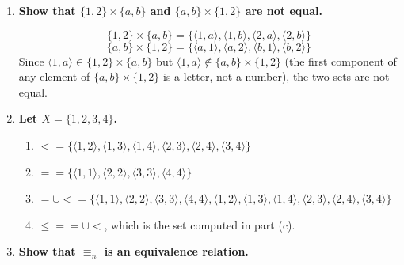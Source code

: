 \documentclass[11pt,openany]{book}
\begin{document}
\begin{enumerate}[{0.}1. ]
\begin{enumerate}
\begin{center}
\end{center}
\end{enumerate}

\item \textbf{Show that $\{1,2\}\times\{a,b\}$ and $\{a,b\}\times\{1,2\}$ are not equal.}

\[
\{1,2\}\times\{a,b\} = \{\langle 1,a\rangle,\langle 1,b\rangle,\langle 2,a\rangle,\langle 2,b\rangle\}
\]
\[
\{a,b\}\times\{1,2\} = \{\langle a,1\rangle,\langle a,2\rangle,\langle b,1\rangle,\langle b,2\rangle\}
\]
Since $\langle 1,a\rangle \in \{1,2\}\times\{a,b\}$ but $\langle 1,a\rangle \notin \{a,b\}\times\{1,2\}$ (the first component of any element of $\{a,b\}\times\{1,2\}$ is a letter, not a number), the two sets are not equal.

\item \textbf{Let $X=\{1,2,3,4\}$.}

\begin{enumerate}
\item $<  =\{\langle 1,2\rangle,\langle 1,3\rangle,\langle 1,4\rangle,\langle 2,3\rangle,\langle 2,4\rangle,\langle 3,4\rangle\}$

\item $=  = \{\langle 1,1\rangle,\langle 2,2\rangle,\langle 3,3\rangle,\langle 4,4\rangle\}$

\item $=\cup< = \{\langle 1,1\rangle,\langle 2,2\rangle,\langle 3,3\rangle,\langle 4,4\rangle,\langle 1,2\rangle,\langle 1,3\rangle,\langle 1,4\rangle,\langle 2,3\rangle,\langle 2,4\rangle,\langle 3,4\rangle\}$

\item $\leq  = =\cup< $, which is the set computed in part (c).
\end{enumerate}

\item \textbf{Show that $\equiv_n$ is an equivalence relation.}


\end{enumerate}
\end{document}
